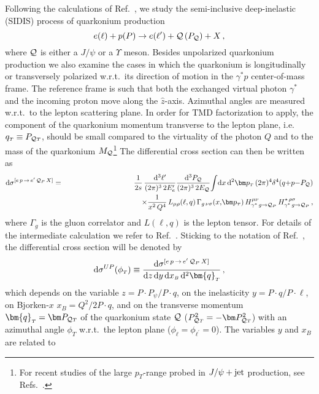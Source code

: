 \documentclass[prd,aps,preprintnumbers,nofootinbib,superscriptaddress]{revtex4}
\newcommand{\xB}{x_{\scriptscriptstyle B}}
\newcommand{\sT}{{\scriptscriptstyle T}}
\renewcommand{\d}{\mathrm{d}}
\begin{document}
Following the calculations of Ref.~\cite{Bacchetta:2018ivt}, we study the semi-inclusive  deep-inelastic (SIDIS) process of quarkonium production
\begin{equation}
e(\ell) + p(P) \to e(\ell^{\prime}) + {\cal Q}\,(P_{\cal Q}) + X\,,
\end{equation}
where ${\cal Q}$ is either a $J/\psi$ or a $\Upsilon$ meson. Besides unpolarized quarkonium production we also examine the cases in which the quarkonium is longitudinally or transversely polarized w.r.t.\ its direction of motion in the $\gamma^*p$ center-of-mass frame. The  reference frame is such that both the exchanged virtual photon $\gamma^*$ and the incoming proton move along the $\hat z$-axis. Azimuthal angles are measured w.r.t.\ to the lepton scattering plane. In order for TMD factorization to apply, the component of the quarkonium momentum transverse to the lepton plane, i.e.\ $q_\sT \equiv  P_{{\cal Q} \sT}$, should be small compared to the virtuality of the photon $Q$ and to the mass of the quarkonium $M_{\cal Q}$\footnote{For recent studies of the large $p_\sT$-range probed in $J/\psi + {\rm jet}$ production, see Refs.~\cite{DAlesio:2019qpk,Kishore:2019fzb}.} The differential cross section can then be written as 
\begin{eqnarray}
\d\sigma^{[e \, p\, \to \, e^\prime\, {\cal Q}_{P}\, X]}
& = &\frac{1}{2 s}\,\frac{\d^3 \ell'}{(2\pi)^3\,2 E_e^{\prime}} \frac{\d^3 P_{\cal Q}}{(2\pi)^3\,2 E_{\cal Q}}
{\int}\d x\, \d^2\bm p_{\sT}\,(2\pi)^4
\delta^4(q {+} p {-} P_{\cal Q})
 \nonumber \\
&&\qquad \qquad\qquad \qquad\qquad\times  \frac{1}{x^2\,Q^4}\, 
L_{\mu \rho}(\ell,q) \,  \Gamma_{g\,\nu\sigma}(x{,} \bm p_{\sT})
\, H^{\mu\nu}_{\gamma^*\, g \rightarrow {\cal Q}_{P} } \,H^{\star\, \rho\sigma}_{\gamma^*\, g \rightarrow {\cal Q}_{P} } \, , 
\label{CrossSec}
\end{eqnarray}
where $ \Gamma_g$ is the gluon correlator and $L(\ell, q)$ is the lepton tensor. For details of the intermediate calculation we refer to  Ref.~\cite{Bacchetta:2018ivt}. Sticking to the notation of Ref.~\cite{Bacchetta:2018ivt}, the differential cross section will be denoted by 
\begin{equation}
\d\sigma^{UP} (\phi_\sT) \equiv \frac{\d\sigma^{[e \, p\, \to \, e^\prime\, {\cal Q}_{P}\, X]}}
{\d z\,\d y\,\d\xB\,\d^2\bm{q}_{\sT}}  \,,
\label{eq:cs}
\end{equation}
which depends on the variable $z = P\cdot P_\psi/P\cdot q$, on the inelasticity $y = P\cdot q/P\cdot \ell$, on Bjorken-$x$  $\xB = Q^2/2P\cdot q$, and on the transverse momentum $\bm{q}_{\sT} = \bm P_{{\cal Q}\sT}$ of the quarkonium state ${\cal Q}$ ($P_{{\cal Q}\sT}^2 = -\bm P_{{\cal Q}\sT}^2$) with an azimuthal angle $\phi_\sT$ w.r.t.\ the lepton plane ($\phi_{\ell}=\phi_{\ell^\prime}=0$). The variables $y$ and $\xB$ are related to
\end{document}
